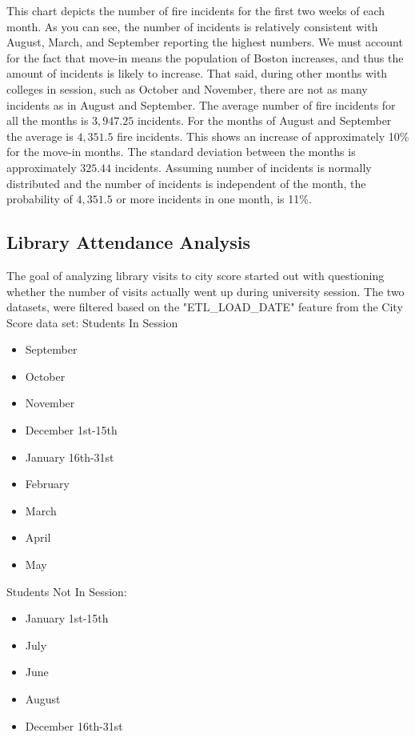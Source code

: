 \documentclass[journal, a4paper]{IEEEtran}
\begin{document}
This chart depicts the number of fire incidents for the first two weeks of each month. As you can see, the number of incidents is relatively consistent with August, March, and September reporting the highest numbers. 
We must account for the fact that move-in means the population of Boston increases, and thus the amount of incidents is likely to increase. That said, during other months with colleges in session, such as October and November, there are not as many incidents as in August and September.
The average number of fire incidents for all the months is $3,947.25$ incidents. For the months of August and September the average is $4,351.5$ fire incidents. This shows an increase of approximately 10\% for the move-in months. The standard deviation between the months is approximately $325.44$ incidents. Assuming number of incidents is normally distributed and the number of incidents is independent of the month, the probability of $4,351.5$ or more incidents in one month, is 11\%.



\subsection{Library Attendance Analysis}
The goal of analyzing library visits to city score started out with questioning whether the number of visits actually went up during university session. The two datasets, were filtered based on the "ETL\_LOAD\_DATE" feature from the City Score data set:
\newline Students In Session
\begin{itemize}
    \item September
    \item October 
    \item November
    \item December 1st-15th
    \item January 16th-31st
    \item February
    \item March
    \item April
    \item May
\end{itemize}
Students Not In Session: 
\begin{itemize}
    \item January 1st-15th
    \item July
    \item June
    \item August
    \item December 16th-31st
\end{itemize}
\end{document}
